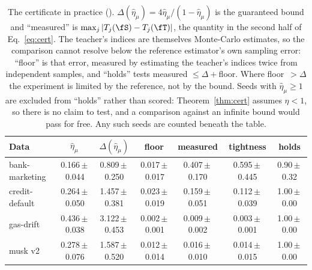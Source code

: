 \begin{table}[t]
\caption{The certificate in practice (\GASPCE). $\Delta(\hat\eta_\mu)=4\hat\eta_\mu/(1-\hat\eta_\mu)$ is the guaranteed bound and ``measured'' is $\max_j|T_j(\fS)-T_j(\fT)|$, the quantity in the second half of Eq.~\ref{eq:cert}. The teacher's indices are themselves Monte-Carlo estimates, so the comparison cannot resolve below the reference estimator's own sampling error: ``floor'' is that error, measured by estimating the teacher's indices twice from independent samples, and ``holds'' tests measured $\le\Delta+$floor. Where floor~$>\Delta$ the experiment is limited by the reference, not by the bound. Seeds with $\hat\eta_\mu\ge1$ are excluded from ``holds'' rather than scored: Theorem~\ref{thm:cert} assumes $\eta<1$, so there is no claim to test, and a comparison against an infinite bound would pass for free. Any such seeds are counted beneath the table.}
\label{tab:certificate}
\begin{center}\footnotesize
\begin{tabular}{@{}lcccccc@{}}
\toprule
\textbf{Data} & $\hat\eta_\mu$ & $\Delta(\hat\eta_\mu)$ & \textbf{floor} & \textbf{measured} & \textbf{tightness} & \textbf{holds} \\
\midrule
bank-marketing & 0.166\,$\pm$\,0.044 & 0.809\,$\pm$\,0.250 & 0.017\,$\pm$\,0.017 & 0.407\,$\pm$\,0.170 & 0.595\,$\pm$\,0.445 & 0.90\,$\pm$\,0.32 \\
credit-default & 0.264\,$\pm$\,0.050 & 1.457\,$\pm$\,0.381 & 0.023\,$\pm$\,0.019 & 0.159\,$\pm$\,0.051 & 0.112\,$\pm$\,0.039 & 1.00\,$\pm$\,0.00 \\
gas-drift & 0.436\,$\pm$\,0.038 & 3.122\,$\pm$\,0.453 & 0.002\,$\pm$\,0.001 & 0.009\,$\pm$\,0.002 & 0.003\,$\pm$\,0.001 & 1.00\,$\pm$\,0.00 \\
musk v2 & 0.278\,$\pm$\,0.076 & 1.587\,$\pm$\,0.520 & 0.012\,$\pm$\,0.014 & 0.016\,$\pm$\,0.010 & 0.014\,$\pm$\,0.015 & 1.00\,$\pm$\,0.00 \\
\bottomrule
\end{tabular}
\end{center}
\end{table}

